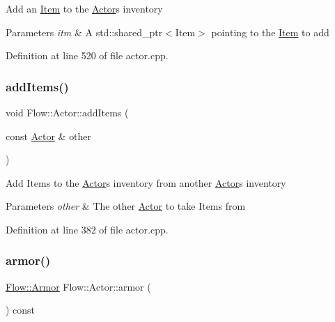 Add an \hyperlink{class_flow_1_1_item}{Item} to the \hyperlink{class_flow_1_1_actor}{Actor}\textquotesingle{}s inventory 
\begin{DoxyParams}{Parameters}
{\em itm} & A std\+::shared\+\_\+ptr$<$\+Item$>$ pointing to the \hyperlink{class_flow_1_1_item}{Item} to add \\
\hline
\end{DoxyParams}


Definition at line 520 of file actor.\+cpp.

\hypertarget{class_flow_1_1_actor_abf713d204f2cf3fc2de46b32c775ebdc}{}\label{class_flow_1_1_actor_abf713d204f2cf3fc2de46b32c775ebdc} 
\subsubsection{\texorpdfstring{add\+Items()}{addItems()}}
{\footnotesize\ttfamily void Flow\+::\+Actor\+::add\+Items (\begin{DoxyParamCaption}\item[{const \hyperlink{class_flow_1_1_actor}{Actor} \&}]{other }\end{DoxyParamCaption})}

Add Items to the \hyperlink{class_flow_1_1_actor}{Actor}\textquotesingle{}s inventory from another \hyperlink{class_flow_1_1_actor}{Actor}\textquotesingle{}s inventory 
\begin{DoxyParams}{Parameters}
{\em other} & The other \hyperlink{class_flow_1_1_actor}{Actor} to take Items from \\
\hline
\end{DoxyParams}


Definition at line 382 of file actor.\+cpp.

\hypertarget{class_flow_1_1_actor_a2b9ad51f3967a2b738f850440e4e56c0}{}\label{class_flow_1_1_actor_a2b9ad51f3967a2b738f850440e4e56c0} 
\subsubsection{\texorpdfstring{armor()}{armor()}}
{\footnotesize\ttfamily \hyperlink{class_flow_1_1_armor}{Flow\+::\+Armor} Flow\+::\+Actor\+::armor (\begin{DoxyParamCaption}{ }\end{DoxyParamCaption}) const}

